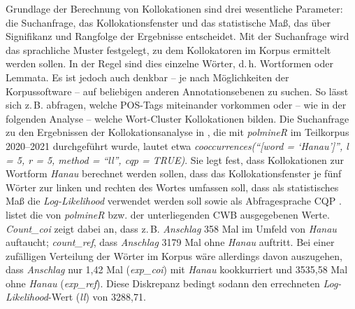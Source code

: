 Grundlage der Berechnung von Kollokationen sind drei wesentliche Parameter: die Suchanfrage, das Kollokationsfenster und das statistische Maß, das über Signifikanz und Rangfolge der Ergebnisse entscheidet. Mit der Suchanfrage wird das sprachliche Muster festgelegt, zu dem Kollokatoren im Korpus ermittelt werden sollen. In der Regel sind dies einzelne Wörter, d.\,h. Wortformen oder Lemmata. Es ist jedoch auch denkbar -- je nach Möglichkeiten der Korpussoftware -- auf beliebigen anderen Annotationsebenen zu suchen. So lässt sich z.\,B. abfragen, welche POS-Tags miteinander vorkommen oder -- wie in der folgenden Analyse -- welche Wort-Cluster Kollokationen bilden. Die Suchanfrage zu den Ergebnissen der Kollokationsanalyse in , die mit \emph{polmineR} im Teilkorpus 2020--2021 durchgeführt wurde, lautet etwa \emph{cooccurrences(``{[}word = `Hanau'{]}'', l = 5, r = 5, method = ``ll'', cqp = TRUE)}. Sie legt fest, dass Kollokationen zur Wortform \emph{Hanau} berechnet werden sollen, dass das Kollokationsfenster je fünf Wörter zur linken und rechten des Wortes umfassen soll, dass als statistisches Maß die \emph{Log-Likelihood} \autocite{dunningAccurateMethodsStatistics1993} verwendet werden soll sowie als Abfragesprache CQP \autocite{evertTwentyfirstCenturyCorpus2011}.  listet die von \emph{polmineR} bzw. der unterliegenden CWB ausgegebenen Werte. \emph{Count\_coi} zeigt dabei an, dass z.\,B. \emph{Anschlag} 358 Mal im Umfeld von \emph{Hanau} auftaucht; \emph{count\_ref}, dass \emph{Anschlag} 3179 Mal ohne \emph{Hanau} auftritt. Bei einer zufälligen Verteilung der Wörter im Korpus wäre allerdings davon auszugehen, dass \emph{Anschlag} nur 1,42 Mal (\emph{exp\_coi}) mit \emph{Hanau} kookkurriert und 3535,58 Mal ohne \emph{Hanau} (\emph{exp\_ref}). Diese Diskrepanz bedingt sodann den errechneten \emph{Log-Likelihood}-Wert (\emph{ll}) von 3288,71.

